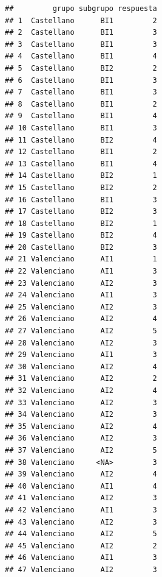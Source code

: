 \documentclass[
]{article}
\begin{document}
\begin{verbatim}
##         grupo subgrupo respuesta
## 1  Castellano      BI1         2
## 2  Castellano      BI1         3
## 3  Castellano      BI1         3
## 4  Castellano      BI1         4
## 5  Castellano      BI2         2
## 6  Castellano      BI1         3
## 7  Castellano      BI1         3
## 8  Castellano      BI1         2
## 9  Castellano      BI1         4
## 10 Castellano      BI1         3
## 11 Castellano      BI2         4
## 12 Castellano      BI1         2
## 13 Castellano      BI1         4
## 14 Castellano      BI2         1
## 15 Castellano      BI2         2
## 16 Castellano      BI1         3
## 17 Castellano      BI2         3
## 18 Castellano      BI2         1
## 19 Castellano      BI2         4
## 20 Castellano      BI2         3
## 21 Valenciano      AI1         1
## 22 Valenciano      AI1         3
## 23 Valenciano      AI2         3
## 24 Valenciano      AI1         3
## 25 Valenciano      AI2         3
## 26 Valenciano      AI2         4
## 27 Valenciano      AI2         5
## 28 Valenciano      AI2         3
## 29 Valenciano      AI1         3
## 30 Valenciano      AI2         4
## 31 Valenciano      AI2         2
## 32 Valenciano      AI2         4
## 33 Valenciano      AI2         3
## 34 Valenciano      AI2         3
## 35 Valenciano      AI2         4
## 36 Valenciano      AI2         3
## 37 Valenciano      AI2         5
## 38 Valenciano     <NA>         3
## 39 Valenciano      AI2         4
## 40 Valenciano      AI1         4
## 41 Valenciano      AI2         3
## 42 Valenciano      AI1         3
## 43 Valenciano      AI2         3
## 44 Valenciano      AI2         5
## 45 Valenciano      AI2         2
## 46 Valenciano      AI1         3
## 47 Valenciano      AI2         3
\end{verbatim}
\end{document}
